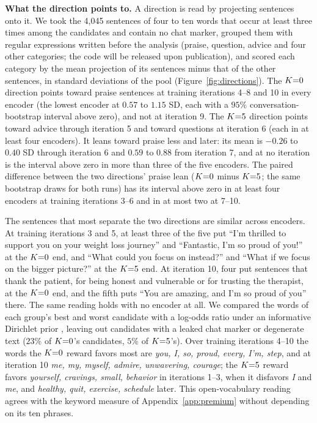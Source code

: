 \textbf{What the direction points to.} A direction is read by projecting sentences onto it. We took
the 4{,}045 sentences of four to ten words that occur at least three times among the candidates and
contain no chat marker, grouped them with regular expressions written before the analysis (praise,
question, advice and four other categories; the code will be released upon publication), and scored each
category by the mean projection of its sentences minus that of the other sentences, in standard
deviations of the pool (Figure~\ref{fig:directions}). The $K{=}0$ direction points toward praise
sentences at training iterations 4--8 and 10 in every encoder (the lowest encoder at $0.57$ to
$1.15$ SD, each with a $95\%$ conversation-bootstrap interval above zero), and not at iteration 9.
The $K{=}5$ direction points toward advice through iteration 5 and toward questions at iteration 6
(each in at least four encoders). It leans toward praise less and later: its mean is $-0.26$ to
$0.40$ SD through iteration 6 and $0.59$ to $0.88$ from iteration 7, and at no iteration is the
interval above zero in more than three of the five encoders. The paired difference between the two
directions' praise lean ($K{=}0$ minus $K{=}5$; the same bootstrap draws for both runs) has its interval
above zero in at least four encoders at training iterations 3--6 and in at most two at 7--10.

The sentences that most separate the two directions are similar across encoders. At training
iterations 3 and 5, at least three of the five put ``I'm thrilled to support you on your weight loss
journey'' and ``Fantastic, I'm so proud of you!'' at the $K{=}0$ end, and ``What could you focus on
instead?'' and ``What if we focus on the bigger picture?'' at the $K{=}5$ end. At iteration 10, four
put sentences that thank the patient, for being honest and vulnerable or for trusting the
therapist, at the $K{=}0$ end, and the fifth puts ``You are amazing, and I'm so proud of you'' there. The same
reading holds with no encoder at all. We compared the words of each group's best and worst
candidate with a log-odds ratio under an informative Dirichlet prior \citep{monroe2008fightin},
leaving out candidates with a leaked chat marker or degenerate text ($23\%$ of $K{=}0$'s candidates,
$5\%$ of $K{=}5$'s). Over training iterations 4--10 the words the $K{=}0$ reward favors most are
\emph{you, I, so, proud, every, I'm, step}, and at iteration 10 \emph{me, my, myself, admire,
unwavering, courage}; the $K{=}5$ reward favors \emph{yourself, cravings, small, behavior} in
iterations 1--3, when it disfavors \emph{I} and \emph{me}, and \emph{healthy, quit, exercise,
schedule} later. This open-vocabulary reading agrees with the keyword measure of
Appendix~\ref{app:premium} without depending on its ten phrases.

